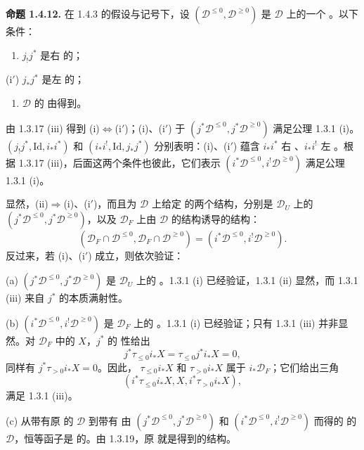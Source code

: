 \par\medskip\noindent\textbf{命题 1.4.12.}
在 1.4.3 的假设与记号下，设 $(\mathcal D^{\le0},\mathcal D^{\ge0})$ 是 $\mathcal D$ 上的一个 。以下条件：
\begin{enumerate}[label=\textup{(\roman*)}]
\item $j_!j^*$ 是右 的；
\end{enumerate}
\noindent(i$'$) $j_*j^*$ 是左 的；
\begin{enumerate}[label=\textup{(\roman*)},start=2]
\item $\mathcal D$ 的 由得到。
\end{enumerate}
由 1.3.17 (iii) 得到 (i)$\Leftrightarrow$(i$'$)；(i)、(i$'$) 于 $(j^*\mathcal D^{\le0},j^*\mathcal D^{\ge0})$ 满足公理 1.3.1 (i)。 $(j_!j^*,\mathrm{Id},i_*i^*)$ 和 $(i_*i^!,\mathrm{Id},j_*j^*)$ 分别表明：(i)、(i$'$) 蕴含 $i_*i^*$ 右 、$i_*i^!$ 左 。根据 1.3.17 (iii)，后面这两个条件也彼此，它们表示 $(i^*\mathcal D^{\le0},i^!\mathcal D^{\ge0})$ 满足公理 1.3.1 (i)。

显然，(ii)$\Rightarrow$(i)、(i$'$)，而且为 $\mathcal D$ 上给定 的两个结构，分别是 $\mathcal D_U$ 上的 $(j^*\mathcal D^{\le0},j^*\mathcal D^{\ge0})$，以及 $\mathcal D_F$ 上由 $\mathcal D$ 的结构诱导的结构：
\[
(\mathcal D_F\cap\mathcal D^{\le0},\mathcal D_F\cap\mathcal D^{\ge0})
 =(i^*\mathcal D^{\le0},i^!\mathcal D^{\ge0}).
\]
反过来，若 (i)、(i$'$) 成立，则依次验证：

(a) $(j^*\mathcal D^{\le0},j^*\mathcal D^{\ge0})$ 是 $\mathcal D_U$ 上的 。1.3.1 (i) 已经验证，1.3.1 (ii) 显然，而 1.3.1 (iii) 来自 $j^*$ 的本质满射性。

(b) $(i^*\mathcal D^{\le0},i^!\mathcal D^{\ge0})$ 是 $\mathcal D_F$ 上的 。1.3.1 (i) 已经验证；只有 1.3.1 (iii) 并非显然。对 $\mathcal D_F$ 中的 $X$，$j^*$ 的 性给出
\[
j^*\tau_{\le0}i_*X=\tau_{\le0}j^*i_*X=0,
\]
同样有 $j^*\tau_{>0}i_*X=0$。因此， $\tau_{\le0}i_*X$ 和 $\tau_{>0}i_*X$ 属于 $i_*\mathcal D_F$；它们给出三角
\[
(i^*\tau_{\le0}i_*X,X,i^*\tau_{>0}i_*X),
\]
满足 1.3.1 (iii)。

(c) 从带有原 的 $\mathcal D$ 到带有
由 $(j^*\mathcal D^{\le0},j^*\mathcal D^{\ge0})$ 和 $(i^*\mathcal D^{\le0},i^!\mathcal D^{\ge0})$ 而得的 的 $\mathcal D$，恒等函子是 的。由 1.3.19，原 就是得到的结构。

